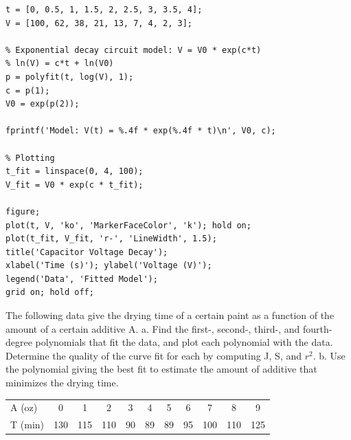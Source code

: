 \begin{lstlisting}
t = [0, 0.5, 1, 1.5, 2, 2.5, 3, 3.5, 4];
V = [100, 62, 38, 21, 13, 7, 4, 2, 3];

% Exponential decay circuit model: V = V0 * exp(c*t)
% ln(V) = c*t + ln(V0)
p = polyfit(t, log(V), 1);
c = p(1);
V0 = exp(p(2));

fprintf('Model: V(t) = %.4f * exp(%.4f * t)\n', V0, c);

% Plotting
t_fit = linspace(0, 4, 100);
V_fit = V0 * exp(c * t_fit);

figure;
plot(t, V, 'ko', 'MarkerFaceColor', 'k'); hold on;
plot(t_fit, V_fit, 'r-', 'LineWidth', 1.5);
title('Capacitor Voltage Decay');
xlabel('Time (s)'); ylabel('Voltage (V)');
legend('Data', 'Fitted Model');
grid on; hold off;
\end{lstlisting}

The following data give the drying time of a certain paint as a function of the amount of a certain additive A.
a. Find the first-, second-, third-, and fourth-degree polynomials that fit the data, and plot each polynomial with the data. Determine the quality of the curve fit for each by computing J, S, and $r^2$.
b. Use the polynomial giving the best fit to estimate the amount of additive that minimizes the drying time.

\begin{table}[h]
\centering
\begin{tabular}{lcccccccccc}
A (oz) & 0 & 1 & 2 & 3 & 4 & 5 & 6 & 7 & 8 & 9 \\
T (min) & 130 & 115 & 110 & 90 & 89 & 89 & 95 & 100 & 110 & 125 \\
\end{tabular}
\end{table}

